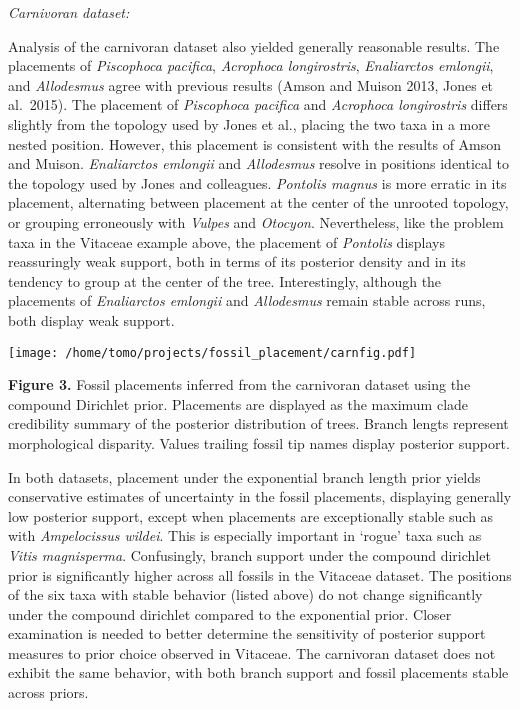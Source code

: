 \documentclass[12pt]{article}
\begin{document}
\emph{Carnivoran dataset:}

Analysis of the carnivoran dataset also yielded generally reasonable
results. The placements of \emph{Piscophoca pacifica}, \emph{Acrophoca
longirostris}, \emph{Enaliarctos emlongii}, and \emph{Allodesmus} agree
with previous results (Amson and Muison 2013, Jones et al.~2015). The
placement of \emph{Piscophoca pacifica} and \emph{Acrophoca
longirostris} differs slightly from the topology used by Jones et al.,
placing the two taxa in a more nested position. However, this placement
is consistent with the results of Amson and Muison. \emph{Enaliarctos
emlongii} and \emph{Allodesmus} resolve in positions identical to the
topology used by Jones and colleagues. \emph{Pontolis magnus} is more
erratic in its placement, alternating between placement at the center of
the unrooted topology, or grouping erroneously with \emph{Vulpes} and
\emph{Otocyon}. Nevertheless, like the problem taxa in the Vitaceae
example above, the placement of \emph{Pontolis} displays reassuringly
weak support, both in terms of its posterior density and in its tendency
to group at the center of the tree. Interestingly, although the
placements of \emph{Enaliarctos emlongii} and \emph{Allodesmus} remain
stable across runs, both display weak support.

\texttt{[image: /home/tomo/projects/fossil\_placement/carnfig.pdf]}

\textbf{Figure 3.} Fossil placements inferred from the carnivoran
dataset using the compound Dirichlet prior. Placements are displayed as
the maximum clade credibility summary of the posterior distribution of
trees. Branch lengts represent morphological disparity. Values trailing
fossil tip names display posterior support.

In both datasets, placement under the exponential branch length prior
yields conservative estimates of uncertainty in the fossil placements,
displaying generally low posterior support, except when placements are
exceptionally stable such as with \emph{Ampelocissus wildei}. This is
especially important in `rogue' taxa such as \emph{Vitis magnisperma}.
Confusingly, branch support under the compound dirichlet prior is
significantly higher across all fossils in the Vitaceae dataset. The
positions of the six taxa with stable behavior (listed above) do not
change significantly under the compound dirichlet compared to the
exponential prior. Closer examination is needed to better determine the
sensitivity of posterior support measures to prior choice observed in
Vitaceae. The carnivoran dataset does not exhibit the same behavior,
with both branch support and fossil placements stable across priors.
\end{document}
